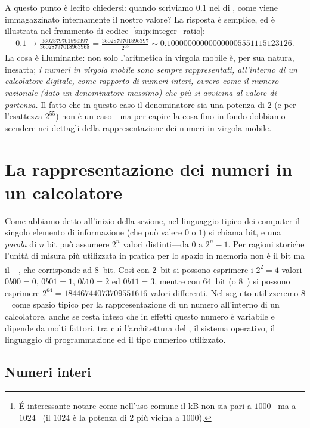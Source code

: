 A questo punto è lecito chiedersi: quando scriviamo $0.1$ nel  di
\python, come viene immagazzinato internamente il nostro valore? La risposta
è semplice, ed è illustrata nel frammento di codice~\ref{snip:integer_ratio}:
\begin{align*}
  0.1 \rightarrow \frac{3602879701896397}{36028797018963968} =
  \frac{3602879701896397}{2^{55}} \sim 0.100000000000000005551115123126.
\end{align*}
La cosa è illuminante: non solo l'aritmetica in virgola mobile è, per sua
natura, inesatta; \emph{i numeri in virgola mobile sono sempre rappresentati,
all'interno di un calcolatore digitale, come rapporto di numeri interi, ovvero
come il numero razionale (dato un denominatore massimo) che più si avvicina al
valore di partenza.}
Il fatto che in questo caso il denominatore sia una potenza di $2$ (e per
l'esattezza $2^{55}$) non è un caso---ma per capire la cosa fino in fondo
dobbiamo scendere nei dettagli della rappresentazione dei numeri in virgola mobile.


\section{La rappresentazione dei numeri in un calcolatore}

Come abbiamo detto all'inizio della sezione, nel linguaggio tipico dei computer
il singolo elemento di informazione (che può valere $0$ o $1$) si chiama
bit, e una \emph{parola} di $n$ bit può assumere $2^n$ valori
distinti---da $0$ a $2^n - 1$. Per ragioni storiche l'unità di misura più
utilizzata in pratica per lo spazio in memoria non è il bit ma il
%
\footnote{\'E interessante notare come nell'uso comune il  kB
  non sia pari a $1000$~ ma a $1024$~ (il $1024$ è
  la potenza di $2$ più vicina a $1000$).}%
, che corrisponde ad 8~bit. Così con 2~bit si possono
esprimere i $2^2 = 4$ valori $0b00 = 0$, $0b01 = 1$, $0b10 = 2$ ed $0b11 = 3$,
mentre con 64~bit (o $8$~) si possono esprimere
$2^{64} = 18446744073709551616$ valori differenti. Nel seguito utilizzeremo
$8$~ come spazio tipico per la rappresentazione di un numero
all'interno di un calcolatore, anche se resta inteso che in effetti questo
numero è variabile e dipende da molti fattori, tra cui l'architettura del
, il sistema operativo, il linguaggio di programmazione ed il
tipo numerico utilizzato.


\subsection{Numeri interi}

